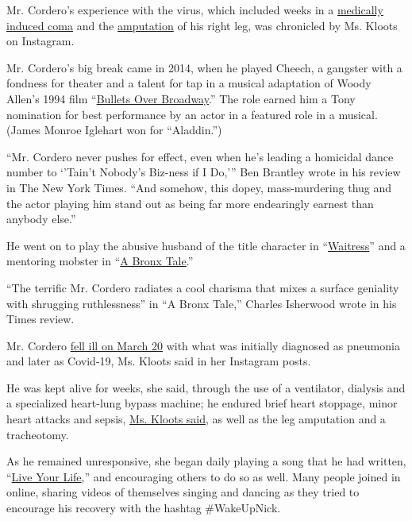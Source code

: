 Mr. Cordero's experience with the virus, which included weeks in a
\href{https://www.latimes.com/entertainment-arts/tv/story/2020-04-30/coronavirus-nick-cordero-amanda-kloots-interview-cbs-this-morning}{medically
induced coma} and the
\href{https://www.today.com/health/nick-cordero-s-wife-his-coronavirus-leg-amputation-it-was-t179215}{amputation}
of his right leg, was chronicled by Ms. Kloots on Instagram.

Mr. Cordero's big break came in 2014, when he played Cheech, a gangster
with a fondness for theater and a talent for tap in a musical adaptation
of Woody Allen's 1994 film ``\href{https://nyti.ms/1lNUKtH}{Bullets Over
Broadway}.'' The role earned him a Tony nomination for best performance
by an actor in a featured role in a musical. (James Monroe Iglehart won
for ``Aladdin.'')

``Mr. Cordero never pushes for effect, even when he's leading a
homicidal dance number to `'Tain't Nobody's Biz-ness if I Do,''' Ben
Brantley wrote in his review in The New York Times. ``And somehow, this
dopey, mass-murdering thug and the actor playing him stand out as being
far more endearingly earnest than anybody else.''

He went on to play the abusive husband of the title character in
``\href{https://nyti.ms/1SYwN0i}{Waitress}'' and a mentoring mobster in
``\href{https://nyti.ms/2gSjZh0}{A Bronx Tale}.''

``The terrific Mr. Cordero radiates a cool charisma that mixes a surface
geniality with shrugging ruthlessness'' in ``A Bronx Tale,'' Charles
Isherwood wrote in his Times review.

Mr. Cordero
\href{https://www.instagram.com/tv/B-hXYJPgalZ/?utm_source=ig_web_copy_link}{fell
ill on March 20} with what was initially diagnosed as pneumonia and
later as Covid-19, Ms. Kloots said in her Instagram posts.

He was kept alive for weeks, she said, through the use of a ventilator,
dialysis and a specialized heart-lung bypass machine; he endured brief
heart stoppage, minor heart attacks and sepsis,
\href{https://www.instagram.com/p/B_8qYEogmw7/}{Ms. Kloots said}, as
well as the leg amputation and a tracheotomy.

As he remained unresponsive, she began daily playing a song that he had
written, ``\href{https://youtu.be/LHTezKJdYTg}{Live Your Life},'' and
encouraging others to do so as well. Many people joined in online,
sharing videos of themselves singing and dancing as they tried to
encourage his recovery with the hashtag \#WakeUpNick.

